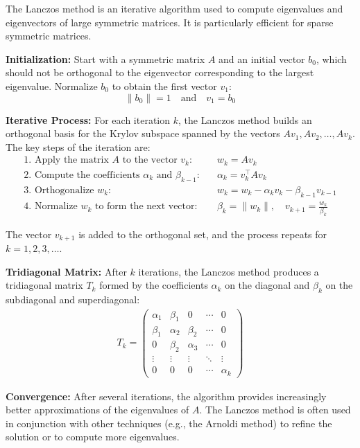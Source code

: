 \documentclass[journal]{IEEEtran}
\begin{document}
\begin{enumerate}
The Lanczos method is an iterative algorithm used to compute eigenvalues and eigenvectors of large symmetric matrices. It is particularly efficient for sparse symmetric matrices.

\textbf{Initialization:} Start with a symmetric matrix $A$ and an initial vector $b_0$, which should not be orthogonal to the eigenvector corresponding to the largest eigenvalue. Normalize $b_0$ to obtain the first vector $v_1$:
\[
\|b_0\| = 1 \quad \text{and} \quad v_1 = b_0
\]

\textbf{Iterative Process:} For each iteration $k$, the Lanczos method builds an orthogonal basis for the Krylov subspace spanned by the vectors $A v_1, A v_2, \dots, A v_k$. The key steps of the iteration are:
\begin{align*}
\text{1. Apply the matrix $A$ to the vector $v_k$:} \quad & w_k = A v_k \\
\text{2. Compute the coefficients $\alpha_k$ and $\beta_{k-1}$:} \quad & \alpha_k = v_k^\top A v_k \\
\text{3. Orthogonalize $w_k$:} \quad & w_k = w_k - \alpha_k v_k - \beta_{k-1} v_{k-1} \\
\text{4. Normalize $w_k$ to form the next vector:} \quad & \beta_k = \|w_k\|, \quad v_{k+1} = \frac{w_k}{\beta_k}
\end{align*}

The vector $v_{k+1}$ is added to the orthogonal set, and the process repeats for $k = 1, 2, 3, \dots$.

\textbf{Tridiagonal Matrix:} After $k$ iterations, the Lanczos method produces a tridiagonal matrix $T_k$ formed by the coefficients $\alpha_k$ on the diagonal and $\beta_k$ on the subdiagonal and superdiagonal:
\begin{align}
T_k = 
\begin{pmatrix}
\alpha_1 & \beta_1 & 0 & \cdots & 0 \\
\beta_1 & \alpha_2 & \beta_2 & \cdots & 0 \\
0 & \beta_2 & \alpha_3 & \cdots & 0 \\
\vdots & \vdots & \vdots & \ddots & \vdots \\
0 & 0 & 0 & \cdots & \alpha_k
\end{pmatrix}
\end{align}

\textbf{Convergence:} After several iterations, the algorithm provides increasingly better approximations of the eigenvalues of $A$. The Lanczos method is often used in conjunction with other techniques (e.g., the Arnoldi method) to refine the solution or to compute more eigenvalues.


\end{enumerate}
\end{document}
